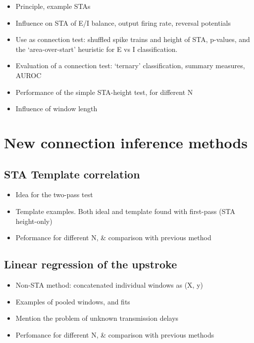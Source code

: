 \documentclass[a4paper, oneside, 11pt]{memoir}
\begin{document}
\begin{itemize}
    \item Principle, example STAs
    \item Influence on STA of E/I balance, output firing rate, reversal potentials
    \item Use as connection test: shuffled spike trains and height of STA, p-values, and the `area-over-start' heuristic for E vs I classification.
    \item Evaluation of a connection test: `ternary' classification, summary measures, AUROC
    \item Performance of the simple STA-height test, for different N
    \item Influence of window length
\end{itemize}


\chapter{New connection inference methods}

\section{STA Template correlation}

\begin{itemize}
    \item Idea for the two-pass test
    \item Template examples. Both ideal and template found with first-pass (STA height-only)
    \item Peformance for different N, \& comparison with previous method
\end{itemize}


\section{Linear regression of the upstroke}

\begin{itemize}
    \item Non-STA method: concatenated individual windows as (X, y)
    \item Examples of pooled windows, and fits
    \item Mention the problem of unknown transmission delays
    \item Perfomance for different N, \& comparison with previous methods
\end{itemize}
\end{document}
